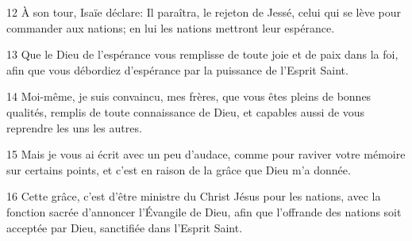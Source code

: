 
12 À son tour, Isaïe déclare: Il paraîtra, le rejeton de Jessé, celui qui se lève pour commander aux nations; en lui les nations mettront leur espérance.

13 Que le Dieu de l’espérance vous remplisse de toute joie et de paix dans la foi, afin que vous débordiez d’espérance par la puissance de l’Esprit Saint.

14 Moi-même, je suis convaincu, mes frères, que vous êtes pleins de bonnes qualités, remplis de toute connaissance de Dieu, et capables aussi de vous reprendre les uns les autres.

15 Mais je vous ai écrit avec un peu d’audace, comme pour raviver votre mémoire sur certains points, et c’est en raison de la grâce que Dieu m’a donnée.

16 Cette grâce, c’est d’être ministre du Christ Jésus pour les nations, avec la fonction sacrée d’annoncer l’Évangile de Dieu, afin que l’offrande des nations soit acceptée par Dieu, sanctifiée dans l’Esprit Saint.